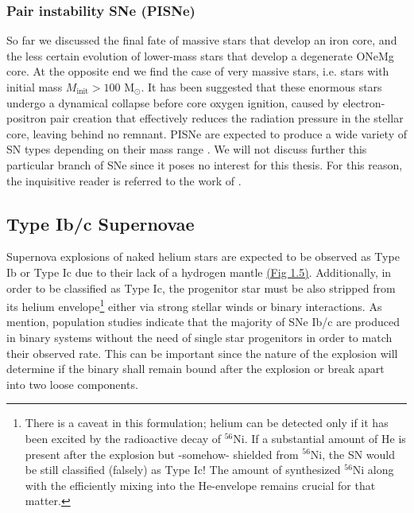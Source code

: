 \documentclass[../../main/thesis_msc.tex]{subfiles}
\begin{document}
				\subsubsection{Pair instability SNe (PISNe)}
				
					So far we discussed the final fate of massive stars that develop an iron core, and the less certain evolution of lower-mass stars that develop a degenerate ONeMg core. At the opposite end we find the case of very massive stars, i.e. stars with initial mass $M_{\text{init}} > 100$ M$_{\odot}$. It has been suggested \citep{langer12} that these enormous stars undergo a dynamical collapse before core oxygen ignition, caused by electron-positron pair creation that effectively reduces the radiation pressure in the stellar core, leaving behind no remnant. PISNe are expected to produce a wide variety of SN types depending on their mass range \citep{Gilmer2017}. We will not discuss further this particular branch of SNe since it poses no interest for this thesis. For this reason, the inquisitive reader is referred to the work of \cite{Langer_PISNe, Woosley_PISNe, Kozyreva2017, Gilmer2017}.
					
				
				
			\subsection{Type Ib/c Supernovae}
			
				Supernova explosions of naked helium stars are expected to be observed as Type Ib or Type Ic due to their lack of a hydrogen mantle \hyperref[fig:SNe_classification]{(Fig 1.5)}. Additionally, in order to be classified as Type Ic, the progenitor star must be also stripped from its helium envelope\footnote{There is a caveat in this formulation; helium can be detected only if it has been excited by the radioactive decay of $^{56}$Ni. If a substantial amount of He is present after the explosion but -somehow- shielded from $^{56}$Ni, the SN would be still classified (falsely) as Type Ic! The amount of synthesized $^{56}$Ni along with the efficiently mixing into the He-envelope remains crucial for that matter.} either via strong stellar winds or binary interactions. As \cite{Yoon2010} mention, population studies indicate that the majority of SNe Ib/c are produced in binary systems without the need of single star progenitors in order to match their observed rate. This can be important since the nature of the explosion will determine if the binary shall remain bound after the explosion or break apart into two loose components.
				
\end{document}
